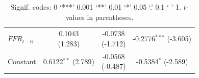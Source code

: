 \documentclass[12pt]{article}
\begin{document}
\begin{enumerate}[label=\alph*.]
\begin{table}[H]
\begin{tabular}{l c c c}
   \(FFR_{t-6}\)              & \shortstack{0.1043\\(1.283)} & \shortstack{-0.0738\\(-1.712)} & \shortstack{-0.2776$^{***}$\\(-3.605)} \\
   Constant                   & \shortstack{0.6122$^{**}$\\(2.789)} & \shortstack{-0.0568\\(-0.487)} & \shortstack{-0.5384$^{*}$\\(-2.589)} \\
   \hline
   \end{tabular}
   \vspace{0.5em}
   \label{tab:q3b}
   \caption*{\footnotesize Signif. codes:  0 ‘***’ 0.001 ‘**’ 0.01 ‘*’ 0.05 ‘.’ 0.1 ‘ ’ 1. $t$-values in parentheses.}
   \end{table}


\end{enumerate}
\end{document}
